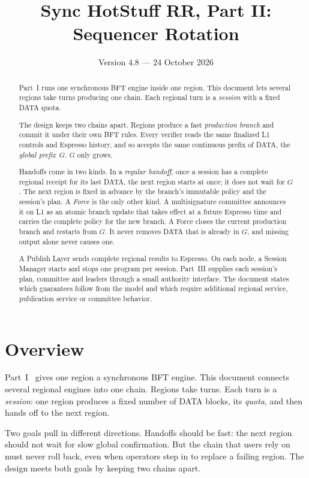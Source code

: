 \documentclass[11pt,a4paper]{article}
\title{Sync HotStuff RR, Part II: Sequencer Rotation}
\author{}\date{Version 4.8 --- 24 October 2026}
\newcommand{\defterm}[1]{\textcolor{rrBlue}{\textit{#1}}}
\begin{document}
\maketitle
\begin{abstract}
Part~I runs one synchronous BFT engine inside one region. This document
lets several regions take turns producing one chain. Each regional turn
is a \emph{session} with a fixed DATA quota.

The design keeps two chains apart. Regions produce a fast
\emph{production branch} and commit it under their own BFT rules.
Every verifier reads
the same finalized L1 controls and Espresso history, and so accepts the
same continuous prefix of DATA, the \emph{global prefix}~$G$. $G$ only
grows.

Handoffs come in two kinds. In a \emph{regular handoff}, once a session
has a complete regional receipt for its last DATA, the next region starts
at once; it does not wait for $G$. The next region is fixed in advance by
the branch's immutable policy and the session's plan. A \emph{Force} is
the only other kind. A multisignature committee announces it on L1 as an
atomic branch update that takes effect at a future Espresso time and
carries the complete policy for the new branch. A Force closes the
current production branch and restarts from $G$. It never removes DATA
that is already in $G$, and missing output alone never causes one.

A Publish Layer sends complete regional results to Espresso. On each
node, a Session Manager starts and stops one program per session.
Part~III supplies each session's plan, committee and leaders through a
small authority interface. The document states which guarantees follow
from the model and which require additional regional service,
publication service or committee behavior.
\end{abstract}

\section{Overview}
\label{sec:overview}
Part~I~\cite{part1} gives one region a synchronous BFT engine.
This document connects several regional engines into one chain. Regions
take turns. Each turn is a \defterm{session}: one region produces a fixed
number of DATA blocks, its \emph{quota}, and then hands off to the next
region.

Two goals pull in different directions. Handoffs should be fast: the next
region should not wait for slow global confirmation. But the chain that
users rely on must never roll back, even when operators step in to
replace a failing region. The design meets both goals by keeping two
chains apart.
\end{document}
